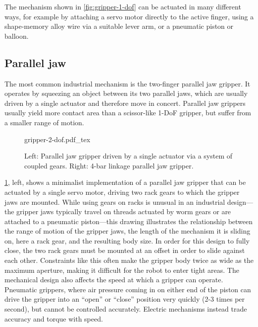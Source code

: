 The mechanism shown in \cref{fig:gripper-1-dof} can be actuated in many different ways, for example by attaching a servo motor directly to the active finger, using a shape-memory alloy wire via a suitable lever arm, or a pneumatic piston or balloon.

\subsection{Parallel jaw}
The most common industrial mechanism is the two-finger parallel jaw gripper. It operates by squeezing an object between its two parallel jaws, which are usually driven by a single actuator and therefore move in concert. Parallel jaw grippers usually yield more contact area than a scissor-like 1-DoF gripper, but suffer from a smaller range of motion.

\begin{figure}
\centering
    \def\svgwidth{\textwidth}
    {gripper-2-dof.pdf_tex}
    \caption{Left: Parallel jaw gripper driven by a single actuator via a system of coupled gears. Right: 4-bar linkage parallel jaw gripper.}\label{fig:paralleljaw}
\end{figure}

\cref{fig:paralleljaw}, left, shows a minimalist implementation of a parallel jaw gripper that can be actuated by a single servo motor, driving two rack gears to which the gripper jaws are mounted. While using gears on racks is unusual in an industrial design---the gripper jaws typically travel on threads actuated by worm gears or are attached to a pneumatic piston---this drawing illustrates the relationship between the range of motion of the gripper jaws, the length of the mechanism it is sliding on, here a rack gear, and the resulting body size. In order for this design to fully close, the two rack gears must be mounted at an offset in order to slide against each other. Constraints like this often make the gripper body twice as wide as the maximum aperture, making it difficult for the robot to enter tight areas. The mechanical design also affects the speed at which a gripper can operate. Pneumatic grippers, where air pressure coming in on either end of the piston can drive the gripper into an ``open'' or ``close'' position very quickly (2-3 times per second), but cannot be controlled accurately. Electric mechanisms instead trade accuracy and torque with speed.

